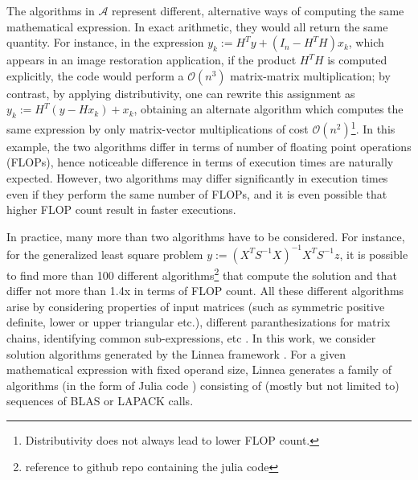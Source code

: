 \documentclass[conference]{IEEEtran}
\begin{document}
The algorithms in $\mathcal{A}$ represent different, alternative ways of computing the same mathematical expression. In exact arithmetic, they would all return the same quantity.  For instance,  in the expression $y_k := H^{T}y + (I_n - H^{T}H)x_k$, which appears in an image restoration application\cite{tirer2018image}, if the product $H^TH$ is computed explicitly, the code would perform a $\mathcal{O}(n^3)$ matrix-matrix multiplication; by contrast, by applying distributivity, one can rewrite this assignment as $y_k := H^{T}(y - Hx_k) + x_k$, obtaining an alternate algorithm which computes the same expression by only matrix-vector multiplications of cost $\mathcal{O}(n^2)$\footnote{Distributivity does not always lead to lower FLOP count.}. In this example, the two algorithms differ in terms of number of floating point operations (FLOPs), hence noticeable difference in terms of execution times are naturally expected. However, two algorithms may differ significantly in execution times even if they perform the same number of FLOPs, and it is even possible that higher FLOP count result in faster executions\cite{barthels2019linnea}.


In practice, many more than two algorithms have to be considered.  For instance, for the generalized least square problem $y := (X^TS^{-1}X)^{-1}X^{T}S^{-1}z$, it is possible to find more than 100 different algorithms\footnote{reference to github repo containing the julia code} that compute the solution and that differ not more than 1.4x in terms of FLOP count.  
All these different algorithms arise by considering properties of input matrices (such as symmetric positive definite, lower or upper triangular etc.), different paranthesizations for matrix chains, identifying common sub-expressions, etc \cite{psarras2019linear}. In this work, we consider solution algorithms generated by the Linnea framework \cite{barthels2019linnea}. For a given mathematical expression with fixed operand size, Linnea generates a family of algorithms (in the form of Julia code \cite{julia}) consisting of (mostly but not limited to) sequences of BLAS or LAPACK calls.
\end{document}
